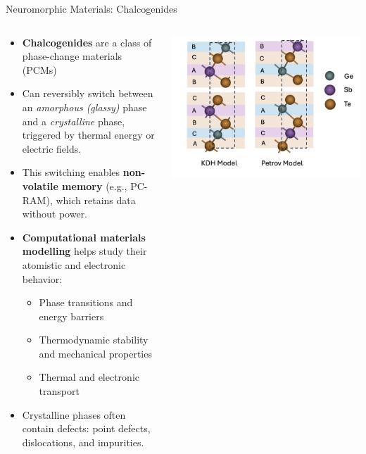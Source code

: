 \documentclass[aspectratio=169]{beamer}
\begin{document}
\begin{frame}{Neuromorphic Materials: Chalcogenides}
  \begin{columns}
    \begin{column}{0.6\textwidth}
      \begin{itemize}
        \item \textbf{Chalcogenides} are a class of phase-change materials (PCMs) 
        \item Can reversibly switch between an \textit{amorphous (glassy)} phase and a \textit{crystalline} phase, triggered by thermal energy or electric fields.
        \item This switching enables \textbf{non-volatile memory} (e.g., PC-RAM), which retains data without power.
        \item \textbf{Computational materials modelling} helps study their atomistic and electronic behavior:
        \begin{itemize}
          \item Phase transitions and energy barriers
          \item Thermodynamic stability and mechanical properties
          \item Thermal and electronic transport
        \end{itemize}
        \item Crystalline phases often contain defects: point defects, dislocations, and impurities.
      \end{itemize}
    \end{column}
    \begin{column}{0.4\textwidth}
      \centering
      \includegraphics[height=0.3\textheight]{media/gst_models.png}

\end{column}
\end{columns}
\end{frame}
\end{document}
